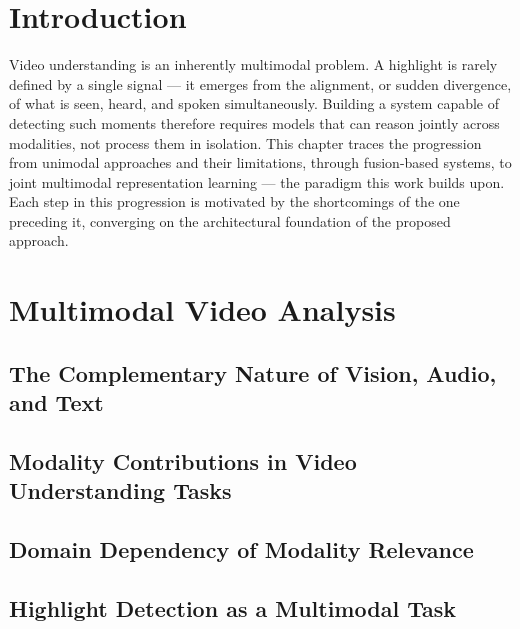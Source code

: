 \documentclass[12pt,a4paper,oneside,english]{book}
\begin{document}
  \section*{Introduction}
Video understanding is an inherently multimodal problem. A highlight is rarely defined by a single signal — it emerges from the alignment, or sudden divergence,  of what is seen, heard, and spoken simultaneously. Building a system capable of detecting such moments therefore requires models that can reason jointly across modalities, not process them in isolation.
This chapter traces the progression from unimodal approaches and their limitations, through fusion-based systems, to joint multimodal representation learning — the paradigm this work builds upon. Each step in this progression is motivated by the shortcomings of the one preceding it, converging on the architectural foundation of the proposed approach.

\section{Multimodal Video Analysis}

    \subsection{The Complementary Nature of Vision, Audio, and Text}

    \subsection{Modality Contributions in Video Understanding Tasks}

    \subsection{Domain Dependency of Modality Relevance}

    \subsection{Highlight Detection as a Multimodal Task}
\end{document}
